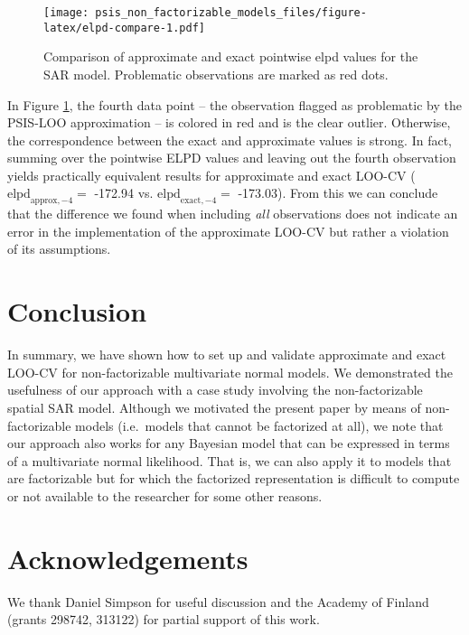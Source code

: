 \documentclass[english,,doc,floatsintext]{apa6}
\theoremstyle{definition}
\theoremstyle{definition}
\theoremstyle{definition}
\theoremstyle{remark}
\begin{document}
\begin{figure}
\centering
\texttt{[image: psis\_non\_factorizable\_models\_files/figure-latex/elpd-compare-1.pdf]}
\caption{\label{fig:elpd-compare}Comparison of approximate and exact
pointwise elpd values for the SAR model. Problematic observations are
marked as red dots.}
\end{figure}

In Figure \ref{fig:elpd-compare}, the fourth data point -- the
observation flagged as problematic by the PSIS-LOO approximation -- is
colored in red and is the clear outlier. Otherwise, the correspondence
between the exact and approximate values is strong. In fact, summing
over the pointwise ELPD values and leaving out the fourth observation
yields practically equivalent results for approximate and exact LOO-CV
(\(\text{elpd}_{\text{approx},-4} =\) -172.94 vs.
\(\text{elpd}_{\text{exact},-4} =\) -173.03). From this we can conclude
that the difference we found when including \emph{all} observations does
not indicate an error in the implementation of the approximate LOO-CV
but rather a violation of its assumptions.

\hypertarget{conclusion}{%
\section{Conclusion}\label{conclusion}}

In summary, we have shown how to set up and validate approximate and
exact LOO-CV for non-factorizable multivariate normal models. We
demonstrated the usefulness of our approach with a case study involving
the non-factorizable spatial SAR model. Although we motivated the
present paper by means of non-factorizable models (i.e.~models that
cannot be factorized at all), we note that our approach also works for
any Bayesian model that can be expressed in terms of a multivariate
normal likelihood. That is, we can also apply it to models that are
factorizable but for which the factorized representation is difficult to
compute or not available to the researcher for some other reasons.

\hypertarget{acknowledgements}{%
\section{Acknowledgements}\label{acknowledgements}}

We thank Daniel Simpson for useful discussion and the Academy of Finland
(grants 298742, 313122) for partial support of this work.
\end{document}
